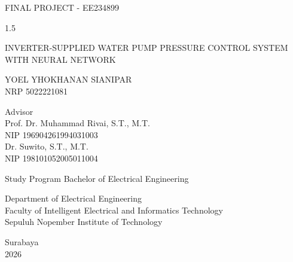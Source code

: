 \begin{large}
  FINAL PROJECT - EE234899
\end{large}

\vspace{\fill}

\begin{spacing}{1.5}
  \begin{Large}
    INVERTER-SUPPLIED WATER PUMP PRESSURE CONTROL SYSTEM WITH NEURAL NETWORK
  \end{Large}
\end{spacing}

\vspace{\fill}

\begin{large}
  YOEL YHOKHANAN SIANIPAR \\
  \textmd{NRP 5022221081}
\end{large}

\vspace{\fill}

\begin{large}
  \textmd{Advisor} \\
  Prof. Dr. Muhammad Rivai, S.T., M.T. \\
  \textmd{NIP 196904261994031003} \\[1em]
  Dr. Suwito, S.T., M.T. \\
  \textmd{NIP 198101052005011004}
\end{large}

\vspace{\fill}

Study Program Bachelor of Electrical Engineering \\

\mdseries

Department of Electrical Engineering \\
Faculty of Intelligent Electrical and Informatics Technology \\
Sepuluh Nopember Institute of Technology

Surabaya \\ 2026{}
